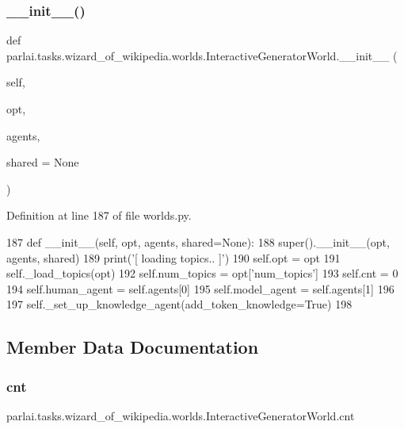 \subsubsection{\texorpdfstring{\+\_\+\+\_\+init\+\_\+\+\_\+()}{\_\_init\_\_()}}
{\footnotesize\ttfamily def parlai.\+tasks.\+wizard\+\_\+of\+\_\+wikipedia.\+worlds.\+Interactive\+Generator\+World.\+\_\+\+\_\+init\+\_\+\+\_\+ (\begin{DoxyParamCaption}\item[{}]{self,  }\item[{}]{opt,  }\item[{}]{agents,  }\item[{}]{shared = {\ttfamily None} }\end{DoxyParamCaption})}



Definition at line 187 of file worlds.\+py.


\begin{DoxyCode}
187     \textcolor{keyword}{def }\_\_init\_\_(self, opt, agents, shared=None):
188         super().\_\_init\_\_(opt, agents, shared)
189         print(\textcolor{stringliteral}{'[ loading topics.. ]'})
190         self.opt = opt
191         self.\_load\_topics(opt)
192         self.num\_topics = opt[\textcolor{stringliteral}{'num\_topics'}]
193         self.cnt = 0
194         self.human\_agent = self.agents[0]
195         self.model\_agent = self.agents[1]
196 
197         self.\_set\_up\_knowledge\_agent(add\_token\_knowledge=\textcolor{keyword}{True})
198 
\end{DoxyCode}


\subsection{Member Data Documentation}
\mbox{\label{classparlai_1_1tasks_1_1wizard__of__wikipedia_1_1worlds_1_1InteractiveGeneratorWorld_ad00587b5ca8230fb8f550d2221445490}} 
\subsubsection{\texorpdfstring{cnt}{cnt}}
{\footnotesize\ttfamily parlai.\+tasks.\+wizard\+\_\+of\+\_\+wikipedia.\+worlds.\+Interactive\+Generator\+World.\+cnt}



